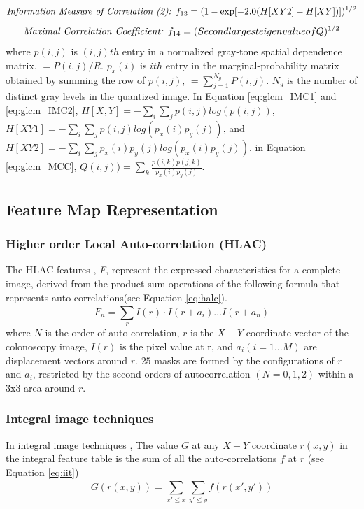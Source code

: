 \documentclass{article}
\begin{document}
	\begin{equation}
		\textit{\text{Information Measure of Correlation (2): }} f_{13} = (1-\exp[-2.0(H[XY2] - H[XY])])^{1/2}
		\label{eq:glcm_IMC2}
	\end{equation}
	\begin{equation}
		\textit{\text{Maximal Correlation Coefficient: }} f_{14} = (Second largest eigenvalue of Q)^{1/2}
		\label{eq:glcm_MCC}
	\end{equation}
	where $p(i,j)$ is $(i,j)th$ entry in a normalized gray-tone spatial dependence matrix, $=P(i,j)/R$. $p_x(i)$ is $ith$ entry in the marginal-probability matrix obtained by summing the row of $p(i,j)$, $=\sum_{j=1}^{N_g}P(i,j)$. $N_g$ is the number of distinct gray levels in the quantized image. In Equation \ref{eq:glcm_IMC1} and \ref{eq:glcm_IMC2}, $H[X,Y] = -\sum_{i}\sum_{j}p(i,j)log(p(i,j))$, $H[XY1] = -\sum_{i}\sum_{j}p(i,j)log(p_x(i)p_y(j))$, and $H[XY2] = -\sum_{i}\sum_{j}p_x(i)p_y(j)log(p_x(i)p_y(j))$. in Equation \ref{eq:glcm_MCC}, $Q(i,j)) = \sum_{k}\frac{p(i,k)p(j,k)}{p_x(i)p_y(j)}$.
	\subsection{Feature Map Representation}
	\subsubsection{Higher order Local Auto-correlation (HLAC)}
	The HLAC features \cite{halc}, \textit{F}, represent the expressed characteristics for a complete image, derived from the product-sum operations of the following formula that represents auto-correlations(see Equation \ref{eq:halc}). 
	\begin{equation}
		F_n = \sum_{r}^{}I(r)\cdot I(r+a_i)\dots I(r+a_n)
		\label{eq:halc}
	\end{equation}
	where $N$ is the order of auto-correlation, $r$ is the $X-Y$ coordinate vector of the colonoscopy image, $I(r)$ is the pixel value at r, and $a_i (i=1…M)$ are displacement vectors around $r$. $25$ masks are formed by the configurations of $r$ and $a_i$, restricted by the second orders of autocorrelation $(N=0, 1, 2)$ within a 3x3 area around $r$.
	\subsubsection{Integral image techniques}
	In integral image techniques \cite{207-212}, The value $G$ at any $X-Y$ coordinate $r(x,y)$ in the integral feature table is the sum of all the auto-correlations $f$ at $r$ (see Equation \ref{eq:iit})
	\begin{equation}
		G(r(x,y)) = \sum_{{x\prime} \le x} \sum_{{y\prime} \le y}^{} f(r({x\prime}, y\prime))
		\label{eq:iit}
	\end{equation}
\end{document}
